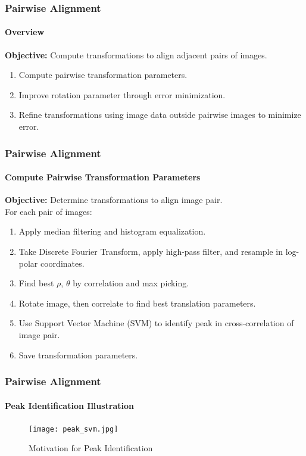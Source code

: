 \documentclass{beamer}
\begin{document}
\begin{frame}
\frametitle{Pairwise Alignment}
\framesubtitle{Overview}
\textbf{Objective:} Compute transformations to align adjacent pairs of images. \\
\begin{enumerate}
\item Compute pairwise transformation parameters.
\item Improve rotation parameter through error minimization.
\item Refine transformations using image data outside pairwise images to minimize error.
\end{enumerate}
\end{frame}

\begin{frame}
\frametitle{Pairwise Alignment}
\framesubtitle{Compute Pairwise Transformation Parameters}
\textbf{Objective:} Determine transformations to align image pair. \\
For each pair of images:
\begin{enumerate}
\item Apply median filtering and histogram equalization. 
\item Take Discrete Fourier Transform, apply high-pass filter, and resample in log-polar coordinates. 
\item Find best $\rho$, $\theta$ by correlation and max picking. 
\item Rotate image, then correlate to find best translation parameters.
\item Use Support Vector Machine (SVM) to identify peak in cross-correlation of image pair. 
\item Save transformation parameters.
\end{enumerate}
\end{frame}

\begin{frame}
\frametitle{Pairwise Alignment}
\framesubtitle{Peak Identification Illustration}
\begin{figure}[p]
	\centering
	\texttt{[image: peak\_svm.jpg]}
	\caption{Motivation for Peak Identification}
	\label{fig:Peak ID}
\end{figure}
\end{frame}
\end{document}

